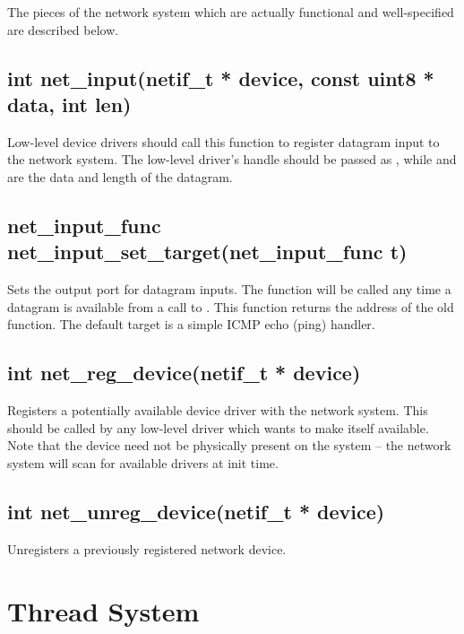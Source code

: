 \documentclass[english]{report}
\begin{document}
The pieces of the network system which are actually functional and
well-specified are described below.


\subsection{int net\_input(netif\_t * device, const uint8 * data, int len)}

Low-level device drivers should call this function to register datagram
input to the network system. The low-level driver's handle should
be passed as , while  and  are the
data and length of the datagram.


\subsection{net\_input\_func net\_input\_set\_target(net\_input\_func t)}

Sets the output port for datagram inputs. The function  will
be called any time a datagram is available from a call to .
This function returns the address of the old function. The default
target is a simple ICMP echo (ping) handler.


\subsection{int net\_reg\_device(netif\_t * device)}

Registers a potentially available device driver with the network system.
This should be called by any low-level driver which wants to make
itself available. Note that the device need not be physically present
on the system -- the network system will scan for available drivers
at init time.


\subsection{int net\_unreg\_device(netif\_t * device)}

Unregisters a previously registered network device.


\section{Thread System}
\end{document}
